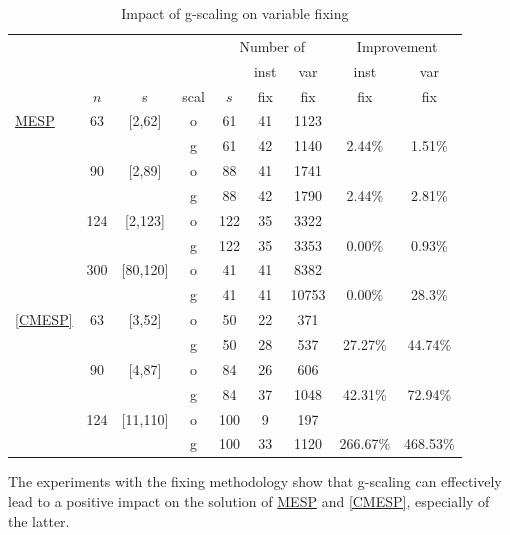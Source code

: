 \documentclass[smallextended]{svjour3hack}       %
\begin{document}
{\begin{table}[ht]
\setlength{\tabcolsep}{1pt}
\begin{center}
\begin{tabular}{l|ccc|ccc|cc}
&&&&\multicolumn{3}{c|}{Number of}&\multicolumn{2}{|c}{Improvement}\\
&$ $& & &$ $&inst &var &inst&var\\
&$n$&s&scal&$s$&fix&fix&fix&fix\\
\hline
\hyperlink{MESP}{MESP}
              & 63  & [2,62] & o & 61  & 41 & 1123   &          &          \\
              &     && g & 61  & 42 & 1140   & 2.44\%   & 1.51\%   \\
              & 90  & [2,89] & o & 88  & 41 & 1741   &          &          \\
              &     && g & 88  & 42 & 1790  & 2.44\%   & 2.81\%   \\
              & 124 & [2,123] & o & 122 & 35 & 3322 &          &          \\
              &     && g & 122 & 35 & 3353  & 0.00\%   & 0.93\%   \\
              & 300 & [80,120] & o & 41 & 41 &8382 &\\
              &     &&  g & 41 & 41 & 10753& 0.00\% &  28.3\%\\
\hline
\ref{CMESP}   & 63  & [3,52] & o & 50  & 22 & 371    &          &          \\
              &     && g & 50  & 28 & 537    & 27.27\%  & 44.74\%  \\
              & 90  & [4,87] & o & 84  & 26 & 606    &          &          \\
              &     && g & 84  & 37 & 1048   & 42.31\%  & 72.94\%  \\
              & 124 & [11,110] & o & 100 & 9  & 197    &          &          \\
              &     && g & 100 & 33 & 1120  & 266.67\% & 468.53\%
\end{tabular}
\end{center}
\caption{Impact of g-scaling on variable fixing}\label{tab:fix}
\end{table}


 The experiments with the fixing methodology
 show that  g-scaling  can effectively lead to a positive impact on the solution of \hyperlink{MESP}{MESP} and \ref{CMESP}, especially of the latter.

}
\end{document}
